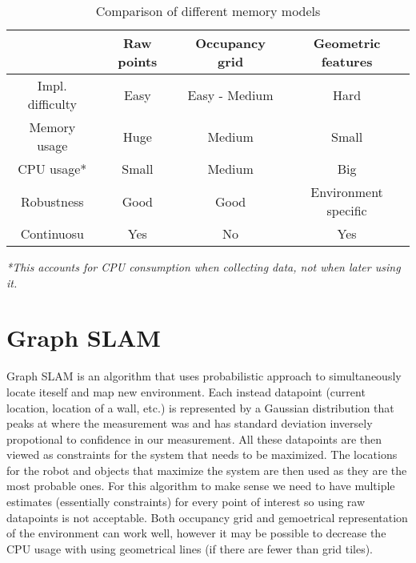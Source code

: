 \documentclass[12pt, a4paper, onecolumn]{article}
\begin{document}
\begin{table}[h!]
  \begin{center}
    \begin{tabular}[c]{|c | c c c|}
      \hline
       & Raw points & Occupancy grid & Geometric features \\
      \hline
      Impl. difficulty & Easy & Easy - Medium & Hard \\
      \hline
      Memory usage & Huge & Medium & Small \\
      \hline
      CPU usage* & Small & Medium & Big \\
      \hline
      Robustness & Good & Good & Environment specific \\
      \hline
      Continuosu & Yes & No & Yes \\
      \hline
    \end{tabular}
  \end{center}
  \caption{Comparison of different memory models}
  \label{tab:memory_models}
\end{table}
\textit{*This accounts for CPU consumption when collecting data, not when later using it.}

\section{Graph SLAM}
Graph SLAM is an algorithm that uses probabilistic approach to simultaneously locate iteself and map new environment.
Each instead datapoint (current location, location of a wall, etc.) is represented by a Gaussian distribution that peaks at where the measurement was
and has standard deviation inversely propotional to confidence in our measurement.
All these datapoints are then viewed as constraints for the system that needs to be maximized.
The locations for the robot and objects that maximize the system are then used as they are the most probable ones.
For this algorithm to make sense we need to have multiple estimates (essentially constraints) for every point of interest so using raw datapoints is not acceptable.
Both occupancy grid and gemoetrical representation of the environment can work well, however it may be possible to decrease the CPU usage with using geometrical lines (if there are fewer than grid tiles).


\end{document}
